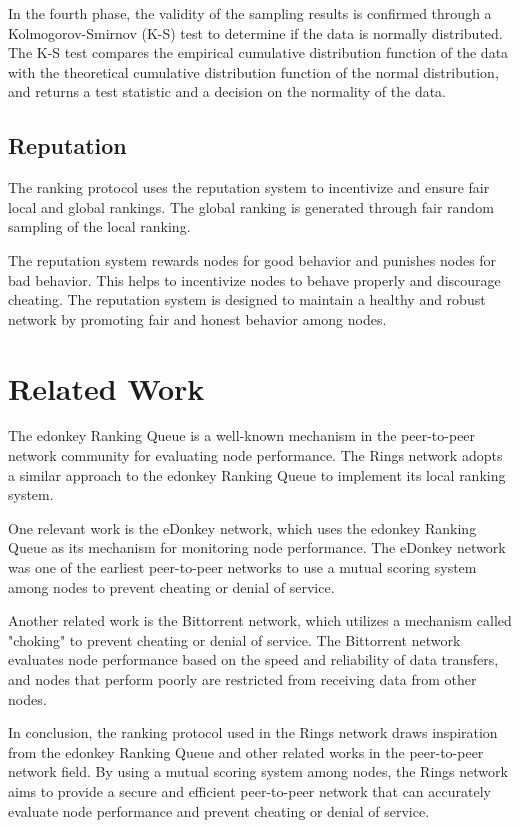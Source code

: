 \documentclass[twocolumn]{article}
\begin{document}
In the fourth phase, the validity of the sampling results is confirmed through a Kolmogorov-Smirnov (K-S) test to determine if the data is normally distributed. The K-S test compares the empirical cumulative distribution function of the data with the theoretical cumulative distribution function of the normal distribution, and returns a test statistic and a decision on the normality of the data.


\subsection{Reputation}

The ranking protocol uses the reputation system to incentivize and ensure fair local and global rankings. The global ranking is generated through fair random sampling of the local ranking.

The reputation system rewards nodes for good behavior and punishes nodes for bad behavior. This helps to incentivize nodes to behave properly and discourage cheating. The reputation system is designed to maintain a healthy and robust network by promoting fair and honest behavior among nodes.

\section{Related Work}

The edonkey Ranking Queue is a well-known mechanism in the peer-to-peer network community for evaluating node performance. The Rings network adopts a similar approach to the edonkey Ranking Queue to implement its local ranking system.

One relevant work is the eDonkey network, which uses the edonkey Ranking Queue as its mechanism for monitoring node performance. The eDonkey network was one of the earliest peer-to-peer networks to use a mutual scoring system among nodes to prevent cheating or denial of service.

Another related work is the Bittorrent network, which utilizes a mechanism called "choking" to prevent cheating or denial of service. The Bittorrent network evaluates node performance based on the speed and reliability of data transfers, and nodes that perform poorly are restricted from receiving data from other nodes.

In conclusion, the ranking protocol used in the Rings network draws inspiration from the edonkey Ranking Queue and other related works in the peer-to-peer network field. By using a mutual scoring system among nodes, the Rings network aims to provide a secure and efficient peer-to-peer network that can accurately evaluate node performance and prevent cheating or denial of service.
\end{document}
